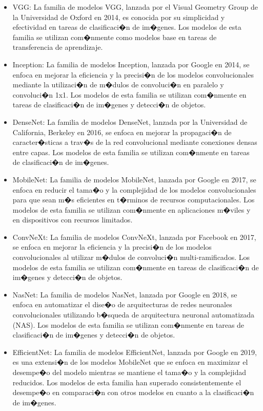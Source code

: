 \documentclass[12pt,letterpaper]{article}
\begin{document}
\begin{itemize}
\item VGG: 
La familia de modelos VGG, lanzada por el Visual Geometry Group de la Universidad de Oxford en 2014, es conocida por su simplicidad y efectividad en tareas de clasificaci�n de im�genes. Los modelos de esta familia se utilizan com�nmente como modelos base en tareas de transferencia de aprendizaje.

\item Inception: 
La familia de modelos Inception, lanzada por Google en 2014, se enfoca en mejorar la eficiencia y la precisi�n de los modelos convolucionales mediante la utilizaci�n de m�dulos de convoluci�n en paralelo y convoluci�n 1x1. Los modelos de esta familia se utilizan com�nmente en tareas de clasificaci�n de im�genes y detecci�n de objetos.

\item DenseNet: 
La familia de modelos DenseNet, lanzada por la Universidad de California, Berkeley en 2016, se enfoca en mejorar la propagaci�n de caracter�sticas a trav�s de la red convolucional mediante conexiones densas entre capas. Los modelos de esta familia se utilizan com�nmente en tareas de clasificaci�n de im�genes.

\item MobileNet: 
La familia de modelos MobileNet, lanzada por Google en 2017, se enfoca en reducir el tama�o y la complejidad de los modelos convolucionales para que sean m�s eficientes en t�rminos de recursos computacionales. Los modelos de esta familia se utilizan com�nmente en aplicaciones m�viles y en dispositivos con recursos limitados.

\item ConvNeXt: 
La familia de modelos ConvNeXt, lanzada por Facebook en 2017, se enfoca en mejorar la eficiencia y la precisi�n de los modelos convolucionales al utilizar m�dulos de convoluci�n multi-ramificados. Los modelos de esta familia se utilizan com�nmente en tareas de clasificaci�n de im�genes y detecci�n de objetos.

\item NasNet:
La familia de modelos NasNet, lanzada por Google en 2018, se enfoca en automatizar el dise�o de arquitecturas de redes neuronales convolucionales utilizando b�squeda de arquitectura neuronal automatizada (NAS). Los modelos de esta familia se utilizan com�nmente en tareas de clasificaci�n de im�genes y detecci�n de objetos.

\item EfficientNet: 
La familia de modelos EfficientNet, lanzada por Google en 2019, es una extensi�n de los modelos MobileNet que se enfoca en maximizar el desempe�o del modelo mientras se mantiene el tama�o y la complejidad reducidos. Los modelos de esta familia han superado consistentemente el desempe�o en comparaci�n con otros modelos en cuanto a la clasificaci�n de im�genes.

\end{itemize}
\end{document}
